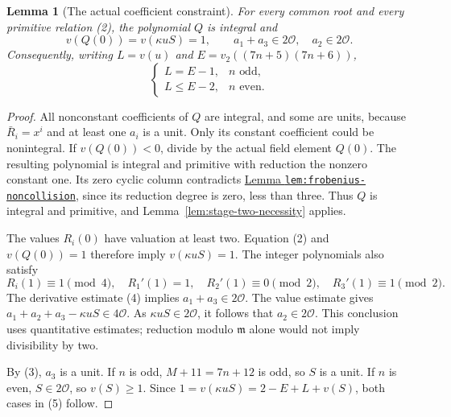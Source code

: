 \documentclass[11pt]{article}
\newtheorem{lemma}{Lemma}
\begin{document}
\begin{lemma}[The actual coefficient constraint]
\label{lem:quantitative-coefficients}
For every common root and every primitive relation (2), the polynomial
$Q$ is integral and
\[
 v(Q(0))=v(\kappa uS)=1,\qquad
 a_1+a_3\in2\mathcal O,\quad a_2\in2\mathcal O.
\]
Consequently, writing $L=v(u)$ and
$E=v_2((7n+5)(7n+6))$,
\[
 \begin{cases}
 L=E-1,&n\text{ odd},\\
 L\le E-2,&n\text{ even}.
 \end{cases}                                             \tag{5}
\]
\end{lemma}
\begin{proof}
All nonconstant coefficients of $Q$ are integral, and some are
units, because $\bar R_i=x^i$ and at least one $a_i$ is a unit.
Only its constant coefficient could be nonintegral.
If $v(Q(0))<0$, divide by the actual field element $Q(0)$.
The resulting polynomial is integral and primitive with reduction
the nonzero constant one. Its zero cyclic column contradicts
\href{ARITHMETIC_FRONTIER_TERMINAL_ORDERS.tex}{Lemma
\texttt{lem:frobenius-noncollision}}, since its reduction degree
is zero, less than three.
Thus $Q$ is integral and primitive, and
Lemma~\ref{lem:stage-two-necessity} applies.

The values $R_i(0)$ have valuation at least two.
Equation (2) and $v(Q(0))=1$ therefore imply
$v(\kappa uS)=1$.
The integer polynomials also satisfy
\[
 R_i(1)\equiv1\pmod4,\quad R_1'(1)=1,\quad
 R_2'(1)\equiv0\pmod2,\quad R_3'(1)\equiv1\pmod2.
\]
The derivative estimate (4) implies $a_1+a_3\in2\mathcal O$.
The value estimate gives
$a_1+a_2+a_3-\kappa uS\in4\mathcal O$.
As $\kappa uS\in2\mathcal O$, it follows that $a_2\in2\mathcal O$.
This conclusion uses quantitative estimates; reduction modulo
$\mathfrak m$ alone would not imply divisibility by two.

By (3), $a_3$ is a unit.
If $n$ is odd, $M+11=7n+12$ is odd, so $S$ is a unit.
If $n$ is even, $S\in2\mathcal O$, so $v(S)\ge1$.
Since $1=v(\kappa uS)=2-E+L+v(S)$, both cases in (5) follow.
\end{proof}
\end{document}
